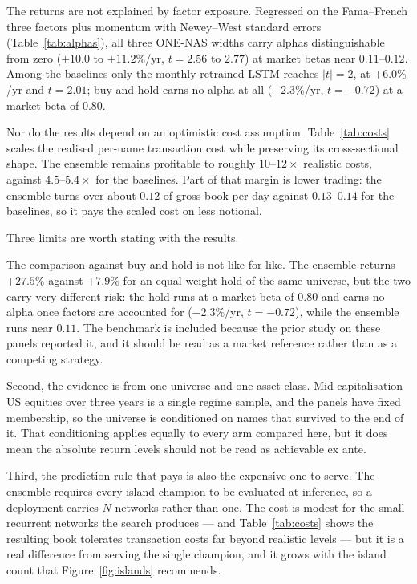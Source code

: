 
The returns are not explained by factor exposure. Regressed on the
Fama--French three factors plus momentum with Newey--West standard errors
(Table~\ref{tab:alphas}), all three ONE-NAS widths carry alphas
distinguishable from zero ($+10.0$ to $+11.2\%$/yr, $t=2.56$ to $2.77$)
at market betas near $0.11$--$0.12$. Among the baselines only the
monthly-retrained LSTM reaches $|t|=2$, at $+6.0\%$/yr and $t=2.01$;
buy and hold earns no alpha at all ($-2.3\%$/yr, $t=-0.72$) at a market
beta of $0.80$.

Nor do the results depend on an optimistic cost assumption.
Table~\ref{tab:costs} scales the realised per-name transaction cost while
preserving its cross-sectional shape. The ensemble remains profitable to
roughly $10$--$12\times$ realistic costs, against $4.5$--$5.4\times$ for
the baselines. Part of that margin is lower trading: the ensemble turns
over about $0.12$ of gross book per day against $0.13$--$0.14$ for the
baselines, so it pays the scaled cost on less notional.


Three limits are worth stating with the results.

The comparison against buy and hold is not like for like. The ensemble
returns $+27.5\%$ against $+7.9\%$ for an equal-weight hold of the same
universe, but the two carry very different risk: the hold runs at a
market beta of $0.80$ and earns no alpha once factors are accounted for
($-2.3\%$/yr, $t=-0.72$), while the ensemble runs near $0.11$. The
benchmark is included because the prior study on these panels reported
it, and it should be read as a market reference rather than as a
competing strategy.

Second, the evidence is from one universe and one asset class.
Mid-capitalisation US equities over three years is a single regime
sample, and the panels have fixed membership, so the universe is
conditioned on names that survived to the end of it. That conditioning
applies equally to every arm compared here, but it does mean the absolute
return levels should not be read as achievable ex ante.

Third, the prediction rule that pays is also the expensive one to serve.
The ensemble requires every island champion to be evaluated at inference,
so a deployment carries $N$ networks rather than one. The cost is modest
for the small recurrent networks the search produces --- and
Table~\ref{tab:costs} shows the resulting book tolerates transaction
costs far beyond realistic levels --- but it is a real difference from
serving the single champion, and it grows with the island count that
Figure~\ref{fig:islands} recommends.
